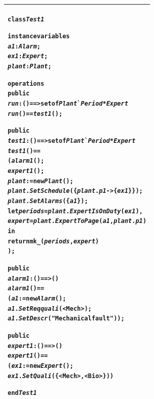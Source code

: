 \documentclass[\pformat,12pt,twoside]{article}
\newenvironment{VDMgray}%
{\begin{tabular}{|G|}\hline\small\begin{alltt}}%
{\end{alltt}\normalsize\\
 \hline\end{tabular}}
\begin{document}
\begin{VDMgray}
\textbf{class} \textit{Test1}

\textbf{instance} \textbf{variables}
 \textit{a1} : \textit{Alarm};
 \textit{ex1} : \textit{Expert};
 \textit{plant} : \textit{Plant};

\textbf{operations}
 \textbf{public}
 \textit{run}: () ==\texttt{>} \textbf{set} \textbf{of} \textit{Plant}\`{}\textit{Period} * \textit{Expert}
 \textit{run}() == \textit{test1}();

 \textbf{public}
 \textit{test1}: () ==\texttt{>} \textbf{set} \textbf{of} \textit{Plant}\`{}\textit{Period} * \textit{Expert}
 \textit{test1}() ==
   (\textit{alarm1}();
    \textit{expert1}();
    \textit{plant}:= \textbf{new} \textit{Plant}();
    \textit{plant}.\textit{SetSchedule}(\{\textit{plant}.\textit{p1} {\textbar}-\texttt{>} \{\textit{ex1}\}\});
    \textit{plant}.\textit{SetAlarms}(\{\textit{a1}\});
    \textbf{let} \textit{periods} = \textit{plant}.\textit{ExpertIsOnDuty}(\textit{ex1}),
        \textit{expert} = \textit{plant}.\textit{ExpertToPage}(\textit{a1},\textit{plant}.\textit{p1})
    \textbf{in}
      \textbf{return} \textbf{mk\_}(\textit{periods},\textit{expert})
  );

 \textbf{public}
 \textit{alarm1}: () ==\texttt{>} ()
 \textit{alarm1}() ==
   (\textit{a1}:= \textbf{new} \textit{Alarm}();
    \textit{a1}.\textit{SetReqquali}(\texttt{<}Mech\texttt{>});
    \textit{a1}.\textit{SetDescr}("Mechanical fault"));

 \textbf{public}
 \textit{expert1}: () ==\texttt{>} ()
 \textit{expert1}() ==
   (\textit{ex1}:= \textbf{new} \textit{Expert}();
    \textit{ex1}.\textit{SetQuali}(\{\texttt{<}Mech\texttt{>},\texttt{<}Bio\texttt{>}\}))

\textbf{end} \textit{Test1}
\end{VDMgray}
\end{document}
